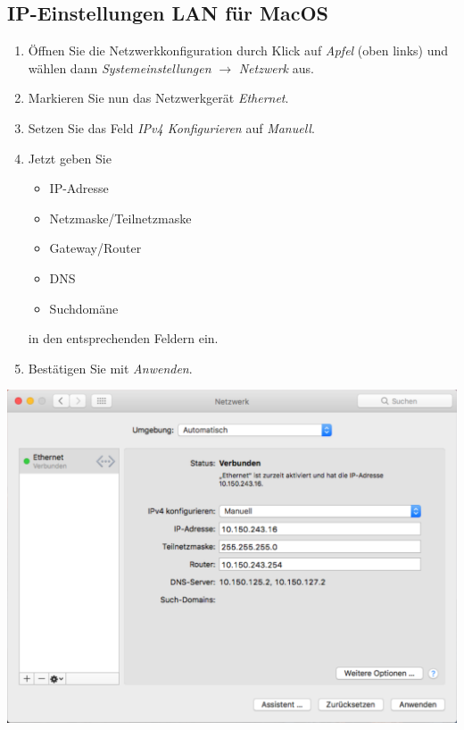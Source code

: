 \documentclass[a4paper,12pt]{scrartcl}
\begin{document}
\subsection{IP-Einstellungen LAN für MacOS}

\begin{minipage}{0.57\textwidth}
\begin{enumerate}
    \item Öffnen Sie die Netzwerkkonfiguration durch Klick auf \emph{Apfel} (oben links) und wählen dann \emph{Systemeinstellungen} $\rightarrow$ \emph{Netzwerk} aus.
    \item Markieren Sie nun das Netzwerkgerät \emph{Ethernet}.
    \item Setzen Sie das Feld \emph{IPv4 Konfigurieren} auf \emph{Manuell}.
    \item Jetzt geben Sie
    \begin{itemize}
    	\item IP-Adresse
    	\item Netzmaske/Teilnetzmaske
    	\item Gateway/Router
    	\item DNS
    	\item Suchdomäne
    \end{itemize}
	in den entsprechenden Feldern ein.
	\item Bestätigen Sie mit \emph{Anwenden}.
\end{enumerate}
\end{minipage}
\hfill
\begin{minipage}{0.4\textwidth}
	\centering
	\includegraphics[width=\linewidth,keepaspectratio]{Bilder/IP_MAC}
\end{minipage}
\end{document}

